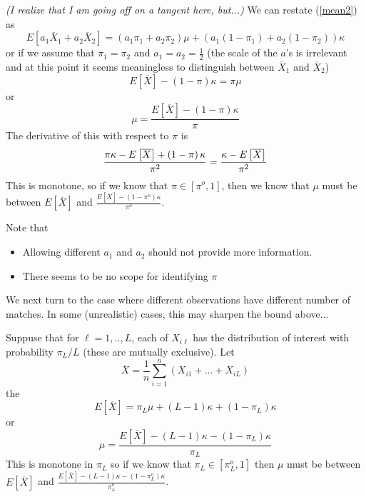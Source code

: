 \documentclass[12pt]{article}
\begin{document}
\textit{(I realize that I am going off on a tangent here, but...) }We can
restate (\ref{mean2}) as
\begin{equation*}
E\left[ a_{1}\overline{X}_{1}+a_{2}\overline{X}_{2}\right] =\left( a_{1}\pi
_{1}+a_{2}\pi _{2}\right) \mu +\left( a_{1}\left( 1-\pi _{1}\right)
+a_{2}\left( 1-\pi _{2}\right) \right) \kappa
\end{equation*}%
or if we assume that $\pi _{1}=\pi _{2}$ and $a_{1}=a_{2}=\frac{1}{2}$ (the
scale of the $a$'s is irrelevant and at this point it seems meaningless to
distinguish between $\overline{X}_{1}$ and $\overline{X}_{2}$)
\begin{equation*}
E\left[ \overline{X}\right] -\left( 1-\pi \right) \kappa =\pi \mu
\end{equation*}%
or%
\begin{equation*}
\mu =\frac{E\left[ \overline{X}\right] -\left( 1-\pi \right) \kappa }{\pi }
\end{equation*}%
The derivative of this with respect to $\pi $ is
\begin{equation*}
\frac{\pi \kappa -E\left[ \overline{X}\right] +\left( 1-\pi \right) \kappa }{%
\pi ^{2}}=\frac{\kappa -E\left[ \overline{X}\right] }{\pi ^{2}}
\end{equation*}%
This is monotone, so if we know that $\pi \in \left[ \pi ^{o},1\right] $,
then we know that $\mu $ must be between $E\left[ \overline{X}\right] $ and $%
\frac{E\left[ \overline{X}\right] -\left( 1-\pi ^{o}\right) \kappa }{\pi ^{o}%
}$.

Note that

\begin{itemize}
\item Allowing different $a_{1}$ and $a_{2}$ should not provide more
information.

\item There seems to be no scope for identifying $\pi $
\end{itemize}

We next turn to the case where different observations have different number
of matches. In some (unrealistic) cases, this may sharpen the bound above...

Suppuse that for $\ell =1,..,L$, each of $X_{i\ell }$ has the distribution
of interest with probability $\pi _{L}/L$ (these are mutually exclusive).
Let
\begin{equation*}
\overline{X}=\frac{1}{n}\sum_{i=1}^{n}\left( X_{i1}+...+X_{iL}\right)
\end{equation*}%
the
\begin{equation}
E\left[ \overline{X}\right] =\pi _{L}\mu +\left( L-1\right) \kappa +\left(
1-\pi _{L}\right) \kappa  \label{meanL}
\end{equation}%
or%
\begin{equation*}
\mu =\frac{E\left[ \overline{X}\right] -\left( L-1\right) \kappa -\left(
1-\pi _{L}\right) \kappa }{\pi _{L}}
\end{equation*}%
This is monotone in $\pi _{L}$ so if we know that $\pi _{L}\in \left[ \pi
_{L}^{o},1\right] $ then $\mu $ must be between $E\left[ \overline{X}\right]
$ and $\frac{E\left[ \overline{X}\right] -\left( L-1\right) \kappa -\left(
1-\pi _{L}^{o}\right) \kappa }{\pi _{L}^{o}}$.
\end{document}
